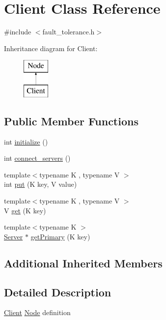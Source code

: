 \hypertarget{classClient}{\section{Client Class Reference}
\label{classClient}
}


{\ttfamily \#include $<$fault\-\_\-tolerance.\-h$>$}

Inheritance diagram for Client\-:\begin{figure}[H]
\begin{center}
\leavevmode
\includegraphics[height=2.000000cm]{classClient}
\end{center}
\end{figure}
\subsection*{Public Member Functions}
\begin{DoxyCompactItemize}
\item 
int \hyperlink{classClient_a5de857af6e3c568925ecd342314617d7}{initialize} ()
\item 
int \hyperlink{classClient_a90a2db07daa07b38544fe3724520f4da}{connect\-\_\-servers} ()
\item 
{\footnotesize template$<$typename K , typename V $>$ }\\int \hyperlink{classClient_aaa4866468879b4e1f6905756191e20d1}{put} (K key, V value)
\item 
{\footnotesize template$<$typename K , typename V $>$ }\\V \hyperlink{classClient_a12d1464831984d5d90358a2abb75f405}{get} (K key)
\item 
{\footnotesize template$<$typename K $>$ }\\\hyperlink{classServer}{Server} $\ast$ \hyperlink{classClient_aab8dfc8e80e752a5f0c1feac7d7ec163}{get\-Primary} (K key)
\end{DoxyCompactItemize}
\subsection*{Additional Inherited Members}


\subsection{Detailed Description}
\hyperlink{classClient}{Client} \hyperlink{classNode}{Node} definition 

